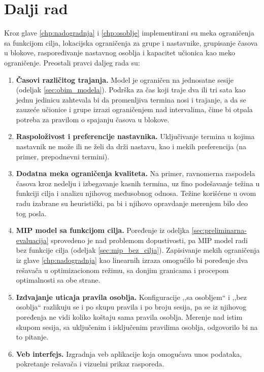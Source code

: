 \documentclass[12pt,oneside]{memoir}
\begin{document}
\section{Dalji rad}

Kroz glave \ref{chp:nadogradnja} i \ref{chp:osoblje} implementirani su
meka ograničenja sa funkcijom cilja, lokacijska ograničenja za grupe i
nastavnike, grupisanje časova u blokove, raspoređivanje nastavnog osoblja
i kapacitet učionica kao meko ograničenje. Preostali pravci daljeg rada
su:

\begin{enumerate}
\item \textbf{Časovi različitog trajanja.}
  Model je ograničen na jednosatne sesije (odeljak
  \ref{sec:obim_modela}). Podrška za čas koji traje dva ili tri sata
  kao jednu jedinicu zahtevala bi da promenljiva termina nosi i
  trajanje, a da se zauzeće učionice i grupe izrazi ograničenjem nad
  intervalima, čime bi otpala potreba za pravilom o spajanju časova u
  blokove.

\item \textbf{Raspoloživost i preferencije nastavnika.}
  Uključivanje termina u kojima nastavnik ne može ili ne želi da drži
  nastavu, kao i mekih preferencija (na primer, prepodnevni termini).

\item \textbf{Dodatna meka ograničenja kvaliteta.}
  Na primer, ravnomerna raspodela časova kroz nedelju i izbegavanje
  kasnih termina, uz fino podešavanje težina u funkciji cilja i analizu
  njihovog međusobnog odnosa. Težine korišćene u ovom radu izabrane su
  heuristički, pa bi i njihovo opravdanje merenjem bilo deo tog posla.

\item \textbf{MIP model sa funkcijom cilja.}
  Poređenje iz odeljka \ref{sec:preliminarna-evaluacija} sprovedeno je
  nad problemom dopustivosti, pa MIP model radi bez funkcije cilja
  (odeljak \ref{sec:mip_bez_cilja}). Zapisivanje mekih ograničenja iz
  glave \ref{chp:nadogradnja} kao linearnih izraza omogućilo bi
  poređenje dva rešavača u optimizacionom režimu, sa donjim granicama i
  procepom optimalnosti sa obe strane.

\item \textbf{Izdvajanje uticaja pravila osoblja.}
  Konfiguracije ,,sa osobljem`` i ,,bez osoblja`` razlikuju se i po
  skupu pravila i po broju sesija, pa se iz njihovog poređenja ne vidi
  koliko koštaju sama pravila osoblja. Merenje nad istim skupom sesija,
  sa uključenim i isključenim pravilima osoblja, odgovorilo bi na to
  pitanje.

\item \textbf{Veb interfejs.}
  Izgradnja veb aplikacije koja omogućava unos podataka,
  pokretanje rešavača i vizuelni prikaz rasporeda.
\end{enumerate}
\end{document}
